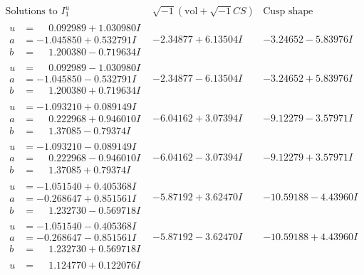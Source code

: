 \documentclass[1p]{elsarticle_modified}
\theoremstyle{definition}
\newcommand{\I}{\sqrt{-1}}
\begin{document}
$$\begin{array}{c|c|c}  
\text{Solutions to }I^u_{1}& \I (\text{vol} + \sqrt{-1}CS) & \text{Cusp shape}\\
 \hline 
\begin{aligned}
u &= \phantom{-}0.092989 + 1.030980 I \\
a &= -1.045850 + 0.532791 I \\
b &= \phantom{-}1.200380 - 0.719634 I\end{aligned}
 & -2.34877 + 6.13504 I & -3.24652 - 5.83976 I \\ \hline\begin{aligned}
u &= \phantom{-}0.092989 - 1.030980 I \\
a &= -1.045850 - 0.532791 I \\
b &= \phantom{-}1.200380 + 0.719634 I\end{aligned}
 & -2.34877 - 6.13504 I & -3.24652 + 5.83976 I \\ \hline\begin{aligned}
u &= -1.093210 + 0.089149 I \\
a &= \phantom{-}0.222968 + 0.946010 I \\
b &= \phantom{-}1.37085 - 0.79374 I\end{aligned}
 & -6.04162 + 3.07394 I & -9.12279 - 3.57971 I \\ \hline\begin{aligned}
u &= -1.093210 - 0.089149 I \\
a &= \phantom{-}0.222968 - 0.946010 I \\
b &= \phantom{-}1.37085 + 0.79374 I\end{aligned}
 & -6.04162 - 3.07394 I & -9.12279 + 3.57971 I \\ \hline\begin{aligned}
u &= -1.051540 + 0.405368 I \\
a &= -0.268647 + 0.851561 I \\
b &= \phantom{-}1.232730 - 0.569718 I\end{aligned}
 & -5.87192 + 3.62470 I & -10.59188 - 4.43960 I \\ \hline\begin{aligned}
u &= -1.051540 - 0.405368 I \\
a &= -0.268647 - 0.851561 I \\
b &= \phantom{-}1.232730 + 0.569718 I\end{aligned}
 & -5.87192 - 3.62470 I & -10.59188 + 4.43960 I \\ \hline\begin{aligned}
u &= \phantom{-}1.124770 + 0.122076 I \\

\end{aligned}
\end{array}$$
\end{document}
